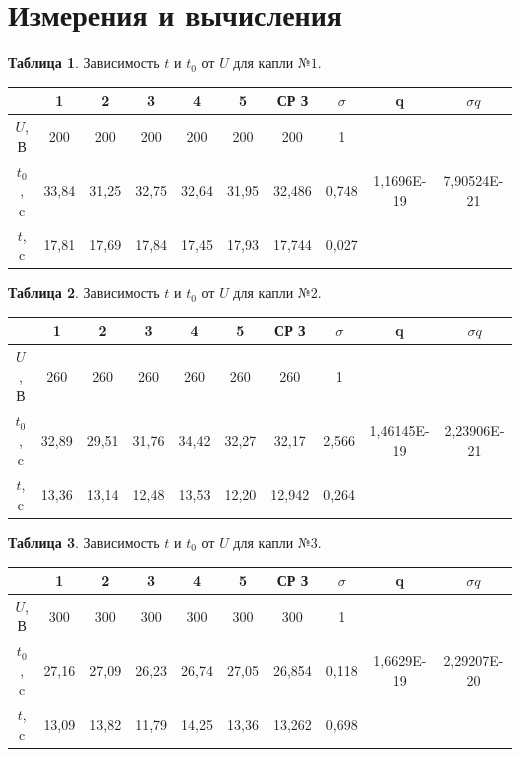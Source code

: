 \documentclass[11pt,a4paper]{article}
\begin{document}
\part*{Измерения и вычисления}
\begin{table}[h!]
	\begin{center}
		\textbf{Таблица 1}. Зависимость $t$ и $t_0$ от $U$ для капли $№1$.\\
	\begin{tabular}{|c|c|c|c|c|c|c|c|c|c|}
		
			\hline
			 & \textbf{1} & \textbf{2} & \textbf{3} &\textbf{4} &\textbf{5} & СР З & $\sigma$ & q& $\sigma q$\\ \hline
			$U$, В & 200 & 200 & 200 & 200 & 200 &  200 &  1 \\ \hline
			$t_0$, c  & 33,84 & 31,25 & 32,75 & 32,64 & 31,95&  32,486 & 0,748 & 1,1696E-19
& 7,90524E-21
\\ \hline
			$t$, c   & 17,81 & 17,69 & 17,84 & 17,45 & 17,93 & 17,744 & 0,027 \\ \hline
	\end{tabular}
	\end{center}
\end{table}
\space
\begin{table}[h!]
	\begin{center}
		\textbf{Таблица 2}. Зависимость $t$ и $t_0$ от $U$ для капли $№2$.\\
	\begin{tabular}{|c|c|c|c|c|c|c|c|c|c|}
		
			\hline
			 & \textbf{1} & \textbf{2} & \textbf{3} &\textbf{4} &\textbf{5} & СР З & $\sigma$  & q& $\sigma q$  \\ \hline
			$U$, В & 260 & 260 & 260 & 260 & 260 &  260 &  1 \\ \hline
			$t_0$, c  & 32,89 & 29,51 & 31,76 & 34,42 & 32,27& 32,17  & 2,566 & 1,46145E-19
& 2,23906E-21
\\ \hline
			$t$, c   & 13,36 & 13,14 & 12,48 & 13,53 & 12,20 & 12,942 & 0,264 \\ \hline
	\end{tabular}
	\end{center}
\end{table}
\space
\begin{table}
	\begin{center}
		\textbf{Таблица 3}. Зависимость $t$ и $t_0$ от $U$ для капли $№3$.\\
	\begin{tabular}{|c|c|c|c|c|c|c|c|c|c|}
		
			\hline
			 & \textbf{1} & \textbf{2} & \textbf{3} &\textbf{4} &\textbf{5} & СР З & $\sigma$  & q& $\sigma q$ \\ \hline
			$U$, В & 300 & 300 & 300 & 300 & 300 &  300 &  1 \\ \hline
			$t_0$, c  & 27,16 & 27,09 & 26,23 & 26,74 & 27,05&  26,854 & 0,118 & 1,6629E-19
 & 2,29207E-20
 \\ \hline
			$t$, c   & 13,09 & 13,82 & 11,79 & 14,25 & 13,36 & 13,262 & 0,698 \\ \hline
	\end{tabular}
	\end{center}
\end{table}
\end{document}
